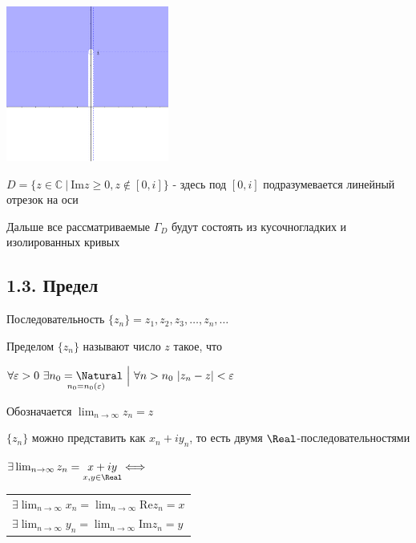 \begin{multicols}{2}
    \includegraphics[width=0.4\textwidth]{addchapters2/images/addchapters2_2025_02_07_4}

     $D = \{z \in \mathbb{C} \ \Big| \ \mathrm{Im} z \geq 0, z \notin [0, i]\}$ - здесь под $[0, i]$ подразумевается линейный отрезок на оси
\end{multicols}

\Nota Дальше все рассматриваемые $\Gamma_D$ будут состоять из кусочногладких и изолированных кривых

\subsection{1.3. Предел}

\Mem Последовательность $\{z_n\} = z_1, z_2, z_3, \dots, z_n, \dots$

\Def Пределом $\{z_n\}$ называют число $z$ такое, что

$\forall \varepsilon > 0 \ \exists \underset{n_0 = n_0(\varepsilon)}{n_0 = \Natural} \ \Big| \ \forall n > n_0 \ |z_n - z| < \varepsilon$

Обозначается $\lim_{n \to \infty} z_n = z$

\Nota $\{z_n\}$ можно представить как ${x_n + i y_n}$, то есть двумя $\Real$-последовательностями

\begin{MyTheorem}
    \Ths $\exists \lim_{n \to \infty} z_n = \underset{x, y \in \Real}{x + i y} \Longleftrightarrow $
    \begin{tabular}{l} $\exists \lim_{n \to \infty} x_n = \lim_{n \to \infty} \mathrm{Re} z_n = x$ \\ $\exists \lim_{n \to \infty} y_n = \lim_{n \to \infty} \mathrm{Im} z_n = y$ \end{tabular}
\end{MyTheorem}

